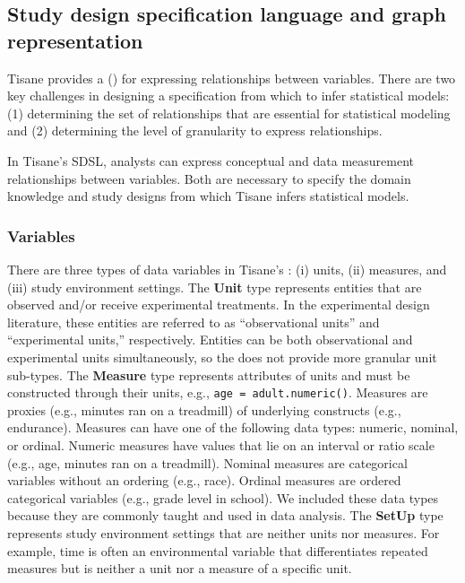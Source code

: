 \subsection{Study design specification language and graph representation} \label{sec:dsl}

Tisane provides a \textit{\SDSLlong} (\textit{\SDSL}) for expressing
relationships between variables. There are two key challenges in designing a
specification from which to infer statistical models: (1) determining the set of
relationships that are essential for statistical modeling and (2) determining
the level of granularity to express relationships.

In Tisane's SDSL, analysts can express conceptual and data measurement
relationships between variables. Both are necessary to specify the domain
knowledge and study designs from which Tisane infers statistical models.

\subsubsection{Variables}
There are three types of data variables in Tisane's \SDSL: (i) units, (ii)
measures, and (iii) study environment settings. The \textbf{Unit} type
represents entities that are observed and/or receive experimental treatments. In
the experimental design literature, these entities are referred to as
``observational units'' and ``experimental units,'' respectively. Entities can
be both observational and experimental units simultaneously, so the \SDSL does
not provide more granular unit sub-types. The \textbf{Measure} type represents
attributes of units and must be constructed through their units, e.g.,
\texttt{age = adult.numeric()}. Measures are proxies (e.g., minutes
ran on a treadmill) of underlying constructs (e.g., endurance). Measures can
have one of the following data types: numeric, nominal, or ordinal. Numeric
measures have values that lie on an interval or ratio scale (e.g., age, minutes
ran on a treadmill). Nominal measures are categorical variables without an
ordering (e.g., race). Ordinal measures are ordered categorical variables (e.g.,
grade level in school). We included these data types because they are
commonly taught and used in data analysis.
The \textbf{SetUp}
type represents study environment settings that are neither units nor measures. For
example, time is often an environmental variable that differentiates repeated
measures but is neither a unit nor a measure %
of a specific unit.

